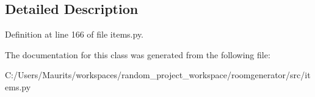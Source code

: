 \subsection{Detailed Description}


Definition at line 166 of file items.\+py.



The documentation for this class was generated from the following file\+:\begin{DoxyCompactItemize}
\item 
C\+:/\+Users/\+Maurits/workspaces/random\+\_\+project\+\_\+workspace/roomgenerator/src/items.\+py\end{DoxyCompactItemize}
